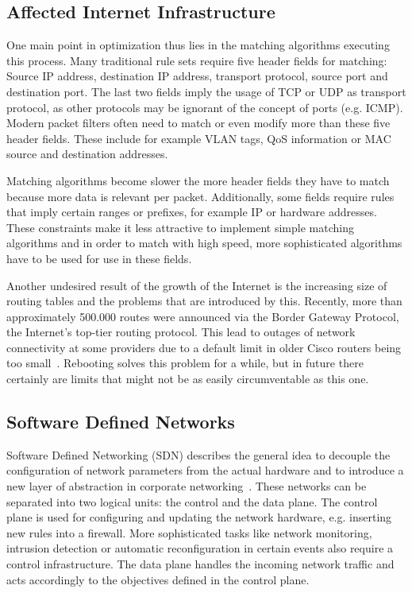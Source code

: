 \documentclass[a4paper,
		12pt,
		parskip=full,
		titlepage
		]{scrartcl}
\begin{document}
\subsection{Affected Internet Infrastructure}
One main point in optimization thus lies in the matching algorithms executing this process.
Many traditional rule sets require five header fields for matching: Source IP address, destination IP address, transport protocol, source port and destination port.
The last two fields imply the usage of TCP or UDP as transport protocol, as other protocols may be ignorant of the concept of ports (e.g. ICMP).
Modern packet filters often need to match or even modify more than these five header fields.
These include for example VLAN tags, QoS information or MAC source and destination addresses.

Matching algorithms become slower the more header fields they have to match because more data is relevant per packet.
Additionally, some fields require rules that imply certain ranges or prefixes, for example IP or hardware addresses.
These constraints make it less attractive to implement simple matching algorithms and in order to match with high speed, more sophisticated
algorithms have to be used for use in these fields.

Another undesired result of the growth of the Internet is the increasing size of routing tables and the problems that are introduced by this.
Recently, more than approximately 500.000 routes were announced via the Border Gateway Protocol, the Internet's top-tier routing protocol.
This lead to outages of network connectivity at some providers due to a default limit in older Cisco routers being too small~\cite{outage}.
Rebooting solves this problem for a while, but in future there certainly are limits that might not be as easily circumventable as this one.

\subsection{Software Defined Networks}
\label{sec:SDN}
Software Defined Networking (SDN) describes the general idea to decouple 
the configuration of network parameters from the actual hardware and to 
introduce a new layer of abstraction in corporate networking~\cite{onf_whitepaper}.
These networks can be separated into two logical units: the control and the data plane.
The control plane is used for configuring and updating the network hardware, e.g. inserting new rules into a firewall.
More sophisticated tasks like network monitoring, intrusion detection or 
automatic reconfiguration in certain events also require a control infrastructure.
The data plane handles the incoming network traffic and acts accordingly to the objectives defined in the control plane.
\end{document}
